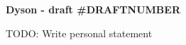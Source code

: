 \documentclass[a4paper, 12pt]{article}
\begin{document}
\begin{center}
	\vspace*{3mm}
	\huge{\textbf{Dyson - draft \#DRAFTNUMBER}}
	\vspace*{10mm}
\end{center}


TODO: Write personal statement
\end{document}
